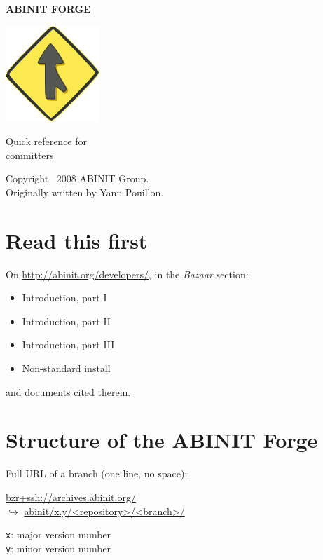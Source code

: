 \documentclass[tumble,foldmark,a4paper]{leaflet}
\begin{document}
\begin{center}
{\Large {\bf ABINIT FORGE}}

\vspace{32mm}

\includegraphics{bzr-logo}

\vspace{24mm}

{\Huge Quick reference for \\[0.5em] committers}

\vspace{40mm}

Copyright \textcopyright\ 2008 ABINIT Group. \\
Originally written by Yann Pouillon.
\end{center}

\newpage

\section*{Read this first}

On \url{http://abinit.org/developers/}, in the \textit{Bazaar} section:
\begin{itemize}
 \item Introduction, part I
 \item Introduction, part II
 \item Introduction, part III
 \item Non-standard install
\end{itemize}
and documents cited therein.

\section*{Structure of the ABINIT Forge}

Full URL of a branch (one line, no space):
\begin{center}
 \url{bzr+ssh://archives.abinit.org/} \\
 $\hookrightarrow$ \url{abinit/x.y/<repository>/<branch>/}
\end{center}

\texttt{x}: major version number \\
\texttt{y}: minor version number \\
\end{document}
